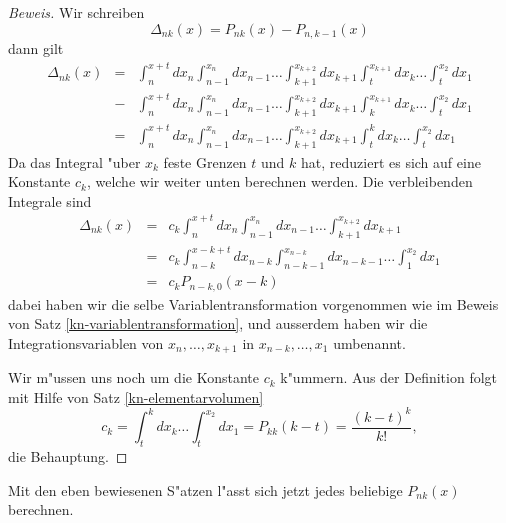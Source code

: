 \begin{proof}[Beweis]
Wir schreiben
\[
\Delta_{nk}(x)= P_{nk}(x)-P_{n,k-1}(x)
\]
dann gilt
\begin{eqnarray*}
\Delta_{nk}(x)
&=&
\int_n^{x+t}dx_n\int_{n-1}^{x_n}dx_{n-1}\dots\int_{k+1}^{x_{k+2}}dx_{k+1}
\int_t^{x_{k+1}}dx_k\dots\int_t^{x_2}dx_1\\
&-&\int_n^{x+t}dx_n\int_{n-1}^{x_n}dx_{n-1}\dots\int_{k+1}^{x_{k+2}}dx_{k+1}
\int_{k}^{x_{k+1}}dx_k\dots\int_t^{x_2}dx_1\\
&=&
\int_n^{x+t}dx_n\int_{n-1}^{x_n}dx_{n-1}\dots\int_{k+1}^{x_{k+2}}dx_{k+1}
\int_{t}^{k}dx_k\dots\int_t^{x_2}dx_1
\end{eqnarray*}
Da das Integral "uber $x_k$ feste Grenzen $t$ und $k$ hat, reduziert es
sich auf eine Konstante $c_k$, welche wir weiter unten berechnen werden.
Die verbleibenden Integrale sind
\begin{eqnarray*}
\Delta_{nk}(x)
&=&
c_k\int_n^{x+t}dx_n\int_{n-1}^{x_n}dx_{n-1}\dots\int_{k+1}^{x_{k+2}}dx_{k+1}\\
&=&
c_k\int_{n-k}^{x-k+t}dx_{n-k}\int_{n-k-1}^{x_{n-k}}dx_{n-k-1}\dots\int_1^{x_2}dx_1\\
&=&c_kP_{n-k,0}(x-k)
\end{eqnarray*}
dabei haben wir die selbe Variablentransformation vorgenommen wie im
Beweis von Satz \ref{kn-variablentransformation}, und ausserdem haben
wir die Integrationsvariablen von $x_n,\dots,x_{k+1}$ in $x_{n-k},\dots,x_1$
umbenannt.

Wir m"ussen uns noch um die Konstante $c_k$ k"ummern.
Aus der Definition folgt mit Hilfe von Satz \ref{kn-elementarvolumen}
\begin{equation}
c_k = \int_{t}^{k}dx_k\dots\int_t^{x_2}dx_1=P_{kk}(k-t)=\frac{(k-t)^k}{k!},
\end{equation}
die Behauptung.
\end{proof}
Mit den eben bewiesenen S"atzen l"asst sich jetzt jedes beliebige 
$P_{nk}(x)$ berechnen.

